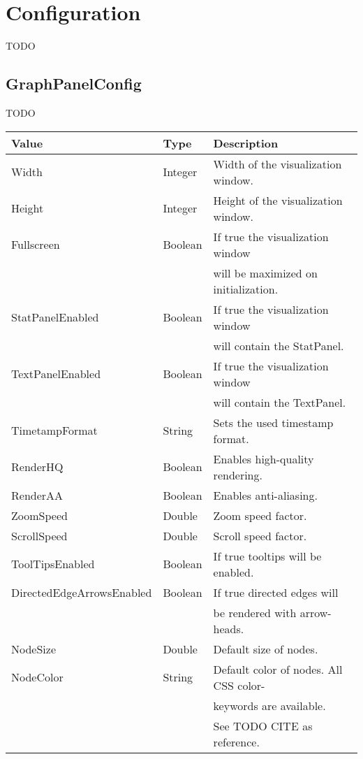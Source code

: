 \chapter{Configuration}
TODO

\section{GraphPanelConfig}
TODO

\begin{table}[h]
\centering
\begin{tabular}[h]{|l|l|l|}\hline
	\textbf{Value} & \textbf{Type} & \textbf{Description}\\
	\hline
	Width & Integer & Width of the visualization window.\\
	\hline
	Height & Integer & Height of the visualization window.\\
	\hline
	Fullscreen & Boolean & If true the visualization window\\
	& & will be maximized on initialization.\\
	\hline
	StatPanelEnabled & Boolean & If true the visualization window\\
	& & will contain the StatPanel.\\
	\hline
	TextPanelEnabled & Boolean & If true the visualization window\\
	& & will contain the TextPanel.\\
	\hline
	TimetampFormat & String & Sets the used timestamp format.\\
	\hline
	RenderHQ & Boolean & Enables high-quality rendering.\\
	\hline
	RenderAA & Boolean & Enables anti-aliasing.\\
	\hline
	ZoomSpeed & Double & Zoom speed factor.\\
	\hline
	ScrollSpeed & Double & Scroll speed factor.\\
	\hline	
	ToolTipsEnabled & Boolean & If true tooltips will be enabled.\\
	\hline	
	DirectedEdgeArrowsEnabled & Boolean & If true directed edges will\\
	& & be rendered with arrow-heads.\\
	\hline
	NodeSize & Double & Default size of nodes.\\
	\hline
	NodeColor & String & Default color of nodes. All CSS color-\\
	& & keywords are available.\\
	& & See TODO CITE as reference.\\

\end{tabular}
\end{table}
